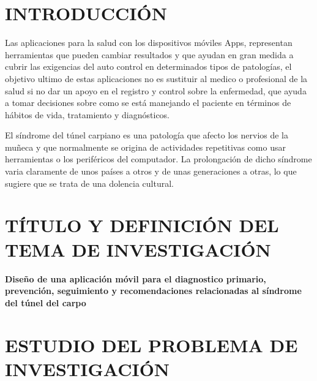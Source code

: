 \documentclass[a4paper,man,natbib]{apa6}
\begin{document}

\tableofcontents

\clearpage
\section{INTRODUCCIÓN}
\justify
Las aplicaciones para la salud con los dispositivos móviles Apps, representan herramientas que pueden cambiar resultados y que ayudan en gran medida  a cubrir las exigencias del auto control en determinados tipos de patologías, el objetivo ultimo de estas aplicaciones no es sustituir al medico o profesional de la salud si no dar un apoyo en el registro y control sobre la enfermedad, que ayuda a tomar decisiones sobre como se está manejando el paciente en términos de hábitos de vida, tratamiento y diagnósticos.

El síndrome del túnel carpiano es una patología que afecto los nervios de la muñeca y que normalmente se origina de actividades repetitivas como usar herramientas o los periféricos del computador. La prolongación de dicho síndrome varia claramente de unos países a otros y de unas generaciones a otras, lo que sugiere que se trata de una dolencia cultural.

\section {TÍTULO Y DEFINICIÓN DEL TEMA DE INVESTIGACIÓN}
\textbf{Diseño de una aplicación móvil para el diagnostico primario, prevención, seguimiento y  recomendaciones relacionadas al síndrome del túnel del carpo}

\section{ESTUDIO DEL PROBLEMA DE INVESTIGACIÓN}
\end{document}
